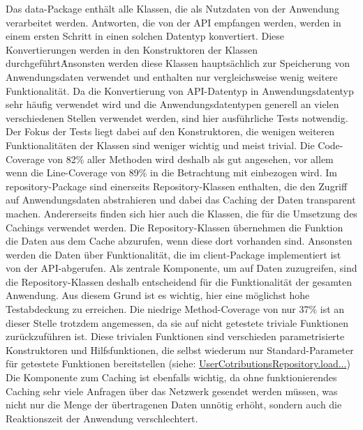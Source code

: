 \newline
\newline
Das data-Package enthält alle Klassen, die als Nutzdaten von der Anwendung verarbeitet werden.
Antworten, die von der API empfangen werden, werden in einem ersten Schritt in einen solchen Datentyp konvertiert.
Diese Konvertierungen werden in den Konstruktoren der Klassen durchgeführt\.
Ansonsten werden diese Klassen hauptsächlich zur Speicherung von Anwendungsdaten verwendet und enthalten nur vergleichsweise wenig weitere Funktionalität.
Da die Konvertierung von API-Datentyp in Anwendungsdatentyp sehr häufig verwendet wird und die Anwendungsdatentypen generell an vielen verschiedenen Stellen verwendet werden, sind hier ausführliche Tests notwendig.
Der Fokus der Tests liegt dabei auf den Konstruktoren, die wenigen weiteren Funktionalitäten der Klassen sind weniger wichtig und meist trivial.
Die Code-Coverage von 82\% aller Methoden wird deshalb als gut angesehen, vor allem wenn die Line-Coverage von 89\% in die Betrachtung mit einbezogen wird.
\newline
\newline
Im repository-Package sind einerseits Repository-Klassen enthalten, die den Zugriff auf Anwendungsdaten abstrahieren und dabei das Caching der Daten transparent machen.
Andererseits finden sich hier auch die Klassen, die für die Umsetzung des Cachings verwendet werden.
Die Repository-Klassen übernehmen die Funktion die Daten aus dem Cache abzurufen, wenn diese dort vorhanden sind.
Ansonsten werden die Daten über Funktionalität, die im client-Package implementiert ist von der API-abgerufen.
Als zentrale Komponente, um auf Daten zuzugreifen, sind die Repository-Klassen deshalb entscheidend für die Funktionalität der gesamten Anwendung.
Aus diesem Grund ist es wichtig, hier eine möglichst hohe Testabdeckung zu erreichen.
Die niedrige Method-Coverage von nur 37\% ist an dieser Stelle trotzdem angemessen, da sie auf nicht getestete triviale Funktionen zurückzuführen ist.
Diese trivialen Funktionen sind verschieden parametrisierte Konstruktoren und Hilfsfunktionen, die selbst wiederum nur Standard-Parameter für getestete Funktionen bereitstellen (siehe: \href{https://github.com/lukaspanni/OpenSourceStats/blob/ac3c4098d8f89f5eed7142d675ca49c4d3dd724f/app/src/main/java/de/lukaspanni/opensourcestats/repository/UserContributionsRepository.java#L51-L65}{UserCotributionsRepository.load...})
\newline
Die Komponente zum Caching ist ebenfalls wichtig, da ohne funktionierendes Caching sehr viele Anfragen über das Netzwerk gesendet werden müssen, was nicht nur die Menge der übertragenen Daten unnötig erhöht, sondern auch die Reaktionszeit der Anwendung verschlechtert.
